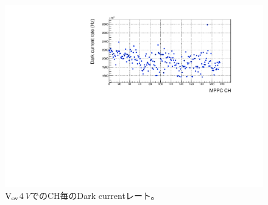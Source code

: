 \begin{figure}
  \centering
  \includegraphics[width=15cm, page=1]{images/chapter3/darkCurrentRate.pdf}
  \caption{$\rm{V_{ov}}$\space$\SI{4}{V}$でのCH毎のDark currentレート。}
  \label{fig:darkCurrentRate2}
\end{figure}